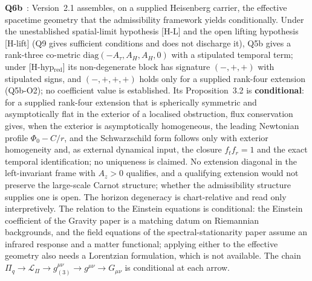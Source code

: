 \documentclass[11pt,a4paper]{article}
\newcommand{\scond}{\textcolor{ccond}{\textbf{conditional}}}
\begin{document}
    \textbf{Q6b}~\cite{Beau2026q6b}: Version~2.1 assembles, on a supplied Heisenberg carrier, the effective
    spacetime geometry that the admissibility framework yields conditionally.
    Under the unestablished spatial-limit hypothesis [H-L] and the open lifting hypothesis [H-lift] (Q9 gives
    sufficient conditions and does not discharge it), Q5b gives a rank-three co-metric
    $\mathrm{diag}(-A_\tau, A_H, A_H, 0)$ with a stipulated temporal term; under [H-hyp$_{\mathrm{red}}$] its
    non-degenerate block has signature $(-,+,+)$ with stipulated signs, and $(-,+,+,+)$ holds only for a supplied
    rank-four extension (Q5b-O2); no coefficient value is established.
    Its Proposition~3.2 is \scond: for a supplied rank-four extension that is spherically symmetric and
    asymptotically flat in the exterior of a localised obstruction, flux conservation gives, when the exterior is
    asymptotically homogeneous, the leading Newtonian profile $\Phi_0 - C/r$, and the Schwarzschild form follows only
    with exterior homogeneity and, as external dynamical input, the closure $f_t f_r = 1$ and the exact temporal
    identification; no uniqueness is claimed.
    No extension diagonal in the left-invariant frame with $A_z > 0$ qualifies, and a qualifying extension would not
    preserve the large-scale Carnot structure; whether the admissibility structure supplies one is open.
    The horizon degeneracy is chart-relative and read only interpretively.
    The relation to the Einstein equations is conditional: the Einstein coefficient of the Gravity paper is a
    matching datum on Riemannian backgrounds, and the field equations of the spectral-stationarity paper assume an
    infrared response and a matter functional; applying either to the effective geometry also needs a Lorentzian
    formulation, which is not available.
    The chain $\Pi_q \to \mathcal{L}_\Pi \to g^{\mu\nu}_{(3)} \to g^{\mu\nu} \to G_{\mu\nu}$ is conditional at
    each arrow.
\end{document}
